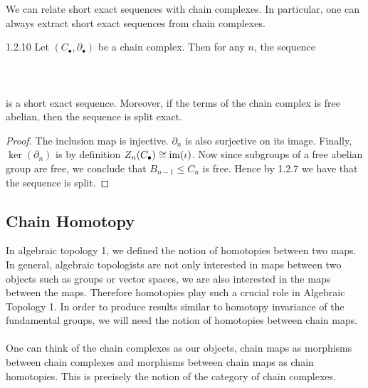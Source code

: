 \documentclass[a4paper]{article}
\begin{document}
We can relate short exact sequences with chain complexes. In particular, one can always extract short exact sequences from chain complexes. 

\begin{lmm}{}{1.2.10} Let $(C_\bullet,\partial_\bullet)$ be a chain complex. Then for any $n$, the sequence \\~\\
\\~\\
is a short exact sequence. Moreover, if the terms of the chain complex is free abelian, then the sequence is split exact. \tcbline
\begin{proof}
The inclusion map is injective. $\partial_n$ is also surjective on its image. Finally, $\ker(\partial_n)$ is by definition $Z_n(C_\bullet)\cong\operatorname{im}(\iota)$. Now since subgroups of a free abelian group are free, we conclude that $B_{n-1}\leq C_n$ is free. Hence by 1.2.7 we have that the sequence is split. 
\end{proof}
\end{lmm}

\subsection{Chain Homotopy}
In algebraic topology 1, we defined the notion of homotopies between two maps. In general, algebraic topologists are not only interested in maps between two objects such as groups or vector spaces, we are also interested in the maps between the maps. Therefore homotopies play such a crucial role in Algebraic Topology 1. In order to produce results similar to homotopy invariance of the fundamental groups, we will need the notion of homotopies between chain maps. \\~\\

One can think of the chain complexes as our objects, chain maps as morphisms between chain complexes and morphisms between chain maps as chain homotopies. This is precisely the notion of the category of chain complexes. 
\end{document}
